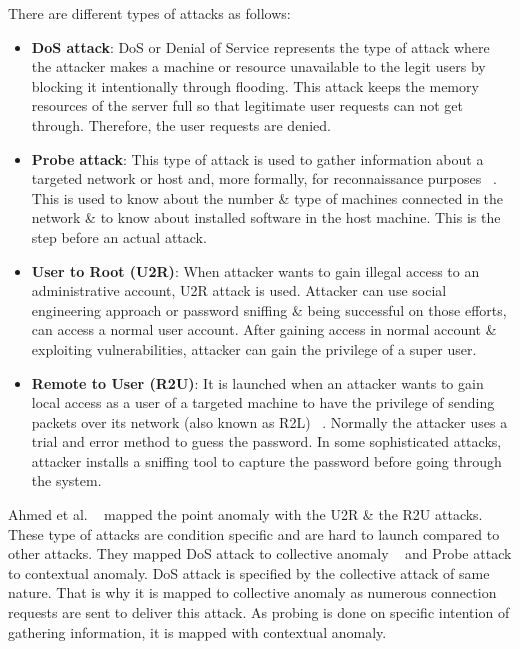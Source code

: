 \documentclass[14pt, conference]{IEEEtran}
\begin{document}
There are different types of  attacks as follows:

\begin{itemize}
    \item \textbf{DoS attack}: DoS or Denial of Service represents the type of attack where the attacker makes a machine or resource unavailable to the legit users by blocking it intentionally through flooding. This attack keeps the memory resources of the server full so that legitimate user requests can not get through. Therefore, the user requests are denied.
    \item \textbf{Probe attack}: This type of attack is used to gather information about a targeted network or host and, more formally, for reconnaissance purposes ~\cite{ahmed2016survey}. This is used to know about the number \& type of machines connected in the network \& to know about installed software in the host machine. This is the step before an actual attack.
    \item \textbf{User to Root (U2R)}: When attacker wants to gain illegal access to an administrative account, U2R attack is used. Attacker can use social engineering approach or password sniffing \& being successful on those efforts, can access a normal user account. After gaining access in normal account \& exploiting vulnerabilities, attacker can gain the privilege of a super user.
    \item \textbf{Remote to User (R2U)}: It is launched when an attacker wants to gain local access as a user of a targeted machine to have the privilege of sending packets over its network (also known as R2L) ~\cite{ahmed2016survey}. Normally the attacker uses a trial and error method to guess the password. In some sophisticated attacks, attacker installs a sniffing tool to capture the password before going through the system.
\end{itemize}

Ahmed et al. ~\cite{ahmed2016survey} mapped the point anomaly with the U2R \& the R2U attacks. These type of attacks are condition specific and are hard to launch compared to other attacks. They mapped DoS attack to collective anomaly ~\cite{ahmed2014network} and Probe attack to contextual anomaly. DoS attack is specified by the collective attack of same nature. That is why it is mapped to collective anomaly as numerous connection requests are sent to deliver this attack. As probing is done on specific intention of gathering information, it is mapped with contextual anomaly.
\end{document}
